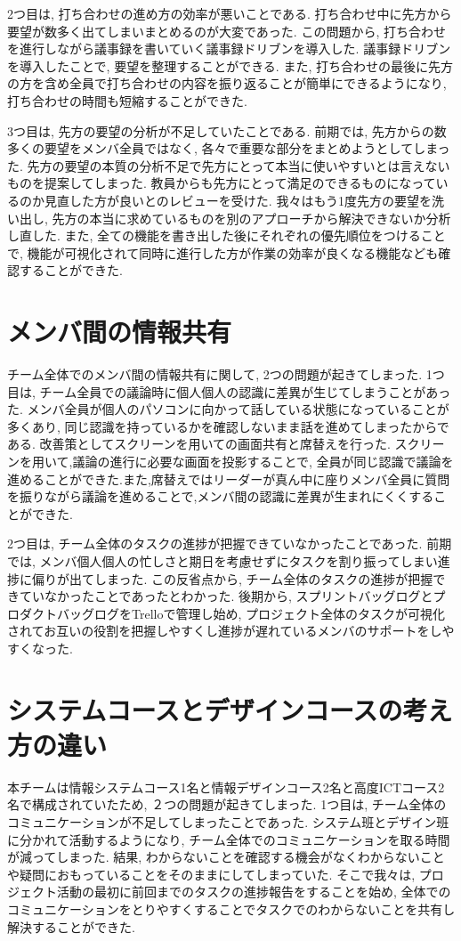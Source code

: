 2つ目は, 打ち合わせの進め方の効率が悪いことである. 打ち合わせ中に先方から要望が数多く出てしまいまとめるのが大変であった. この問題から, 打ち合わせを進行しながら議事録を書いていく議事録ドリブンを導入した.
議事録ドリブンを導入したことで, 要望を整理することができる. また, 打ち合わせの最後に先方の方を含め全員で打ち合わせの内容を振り返ることが簡単にできるようになり, 打ち合わせの時間も短縮することができた.

3つ目は, 先方の要望の分析が不足していたことである.
前期では, 先方からの数多くの要望をメンバ全員ではなく, 各々で重要な部分をまとめようとしてしまった. 先方の要望の本質の分析不足で先方にとって本当に使いやすいとは言えないものを提案してしまった.
教員からも先方にとって満足のできるものになっているのか見直した方が良いとのレビューを受けた. 我々はもう1度先方の要望を洗い出し, 先方の本当に求めているものを別のアプローチから解決できないか分析し直した.
また, 全ての機能を書き出した後にそれぞれの優先順位をつけることで, 機能が可視化されて同時に進行した方が作業の効率が良くなる機能なども確認することができた.
\section{メンバ間の情報共有}
チーム全体でのメンバ間の情報共有に関して, 2つの問題が起きてしまった.
1つ目は, チーム全員での議論時に個人個人の認識に差異が生じてしまうことがあった. メンバ全員が個人のパソコンに向かって話している状態になっていることが多くあり,
同じ認識を持っているかを確認しないまま話を進めてしまったからである. 改善策としてスクリーンを用いての画面共有と席替えを行った. スクリーンを用いて,議論の進行に必要な画面を投影することで,
全員が同じ認識で議論を進めることができた.また,席替えではリーダーが真ん中に座りメンバ全員に質問を振りながら議論を進めることで,メンバ間の認識に差異が生まれにくくすることができた.

2つ目は, チーム全体のタスクの進捗が把握できていなかったことであった. 前期では, メンバ個人個人の忙しさと期日を考慮せずにタスクを割り振ってしまい進捗に偏りが出てしまった.
この反省点から, チーム全体のタスクの進捗が把握できていなかったことであったとわかった. 後期から, スプリントバッグログとプロダクトバッグログをTrelloで管理し始め,
プロジェクト全体のタスクが可視化されてお互いの役割を把握しやすくし進捗が遅れているメンバのサポートをしやすくなった.

\section{システムコースとデザインコースの考え方の違い}
本チームは情報システムコース1名と情報デザインコース2名と高度ICTコース2名で構成されていたため, ２つの問題が起きてしまった.
1つ目は, チーム全体のコミュニケーションが不足してしまったことであった. システム班とデザイン班に分かれて活動するようになり, チーム全体でのコミュニケーションを取る時間が減ってしまった.
結果, わからないことを確認する機会がなくわからないことや疑問におもっていることをそのままにしてしまっていた. そこで我々は, プロジェクト活動の最初に前回までのタスクの進捗報告をすることを始め,
全体でのコミュニケーションをとりやすくすることでタスクでのわからないことを共有し解決することができた.

